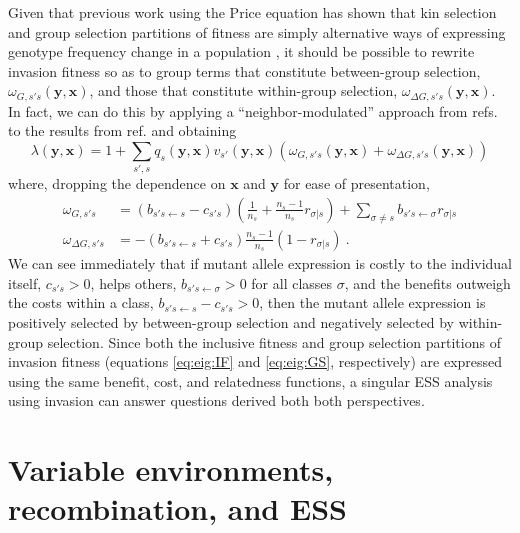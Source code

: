 \documentclass[11pt]{article}
\renewcommand{\vec}[1]{\symbf{#1}}
\newcommand{\eig}{\lambda}
\begin{document}
Given that previous work using the Price equation has shown that kin selection and group selection partitions of fitness are simply alternative ways of expressing genotype frequency change in a population \cite{Queller:1992,Bijma:Wade:2008,Gardner:West:2007,Marshall:2011,Akcay:VanCleve:2012}, it should be possible to rewrite invasion fitness so as to group terms that constitute between-group selection, $\omega_{G,s's}(\vec{y}, \vec{x})$, and those that constitute within-group selection, $\omega_{\Delta G,s's}(\vec{y}, \vec{x})$. In fact, we can do this by applying a ``neighbor-modulated'' approach from refs. \cite{Queller:1992,Akcay:VanCleve:2012} to the results from ref. \cite{Lehmann:Rousset:2020} and obtaining
\begin{equation}
  \label{eq:eig:GS}
  \eig(\vec{y}, \vec{x}) = 1 + \sum_{s',s} q_{s}(\vec{y}, \vec{x}) v_{s'}(\vec{y}, \vec{x})
  \left( \omega_{G,s's}(\vec{y}, \vec{x}) + \omega_{\Delta G,s's}(\vec{y}, \vec{x}) \right)
\end{equation}
where, dropping the dependence on $\vec{x}$ and $\vec{y}$ for ease of presentation,
\begin{equation}
  \label{eq:wg:wdeltag}
  \begin{split}
    \omega_{G,s's} & = \left(b_{s's \leftarrow s} - c_{s's} \right) \left(\frac{1}{n_{s}} + \frac{n_{s}-1}{n_{s}} r_{\sigma|s} \right) + \sum_{\sigma \ne s} b_{s's \leftarrow \sigma} r_{\sigma|s} \\
    \omega_{\Delta G,s's} & = - \left(b_{s's \leftarrow s} + c_{s's}\right) \frac{n_{s}-1}{n_{s}} \left( 1 - r_{\sigma|s} \right) \: .
  \end{split}
\end{equation}
We can see immediately that if mutant allele expression is costly to the individual itself, $c_{s's}>0$, helps others, $b_{s's \leftarrow \sigma}>0$ for all classes $\sigma$, and the benefits outweigh the costs within a class, $b_{s's \leftarrow s} - c_{s's}>0$, then the mutant allele expression is positively selected by between-group selection and negatively selected by within-group selection. Since both the inclusive fitness and group selection partitions of invasion fitness (equations \eqref{eq:eig:IF} and \eqref{eq:eig:GS}, respectively) are expressed using the same benefit, cost, and relatedness functions, a singular ESS analysis using invasion can answer questions derived both both perspectives.

\section{Variable environments, recombination, and ESS}
\end{document}
